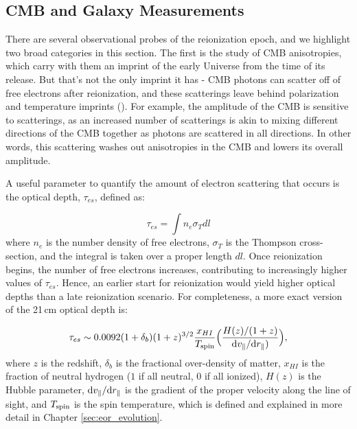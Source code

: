 \subsection{CMB and Galaxy Measurements}

There are several observational probes of the reionization epoch, and we highlight two broad categories in this section. The first is the study of CMB anisotropies, which carry with them an imprint of the early Universe from the time of its release. But that's not the only imprint it has - CMB photons can scatter off of free electrons after reionization, and these scatterings leave behind polarization and temperature imprints (\citealt{haiman_knox_1999}). For example, the amplitude of the CMB is sensitive to scatterings, as an increased number of scatterings is akin to mixing different directions of the CMB together as photons are scattered in all directions. In other words, this scattering washes out anisotropies in the CMB and lowers its overall amplitude. 

A useful parameter to quantify the amount of electron scattering that occurs is the optical depth, $\tau_{es}$, defined as:

\begin{equation}
\tau_{es} = \int n_{e}\sigma_{T} dl 
\end{equation}
where $n_{e}$ is the number density of free electrons, $\sigma_{T}$ is the Thompson cross-section, and the integral is taken over a proper length $dl$. Once reionization begins, the number of free electrons increases, contributing to increasingly higher values of $\tau_{es}$. Hence, an earlier start for reionization would yield higher optical depths than a late reionization scenario. For completeness, a more exact version of the 21\,cm optical depth is:

\begin{equation}
\tau_{es}	\sim 0.0092(1+\delta_{b})(1+z)^{3/2}\frac{x_{HI}}{T_{\rm spin}}\Big(\frac{H(z)/(1+z)}{{\rm d}v_{\parallel}/{\rm d}r_{\parallel})}\Big),
\end{equation}
where $z$ is the redshift, $\delta_{b}$ is the fractional over-density of matter, $x_{HI}$ is the fraction of neutral hydrogen ($1$ if all neutral, $0$ if all ionized), $H(z)$ is the Hubble parameter, ${\rm d}v_{\parallel}/{\rm d}r_{\parallel}$ is the gradient of the proper velocity along the line of sight, and $T_{\rm spin}$ is the spin temperature, which is defined and explained in more detail in Chapter \ref{sec:eor_evolution}.

